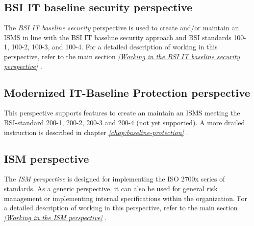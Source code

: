 \documentclass[a4paper,10pt]{book}
\begin{document}
\subsection{BSI IT baseline security perspective}
The {\em BSI IT baseline security} perspective is used to create and/or
maintain an ISMS in line with the BSI IT baseline security approach and BSI standards 100-1, 100-2, 100-3, and 100-4.
For a detailed description of working in this perspective, refer to the main section
{\em \ref{Working in the BSI IT baseline security perspective}  }.

\subsection{Modernized IT-Baseline Protection perspective}
This perspective supports features to create an maintain an ISMS meeting the
BSI-standard 200-1, 200-2, 200-3 and 200-4 (not yet supported).  A more drailed
instruction is described in chapter \emph{\ref{chap:baseline-protection}
}.

\subsection{ISM perspective}
The {\em ISM perspective} is designed for implementing the ISO 2700x series of standards. As a generic perspective,
it can also be used for general risk management or implementing internal specifications within the organization.
For a detailed description of working in this perspective, refer to the main section
{\em \ref{Working in the ISM perspective} }.
\end{document}
